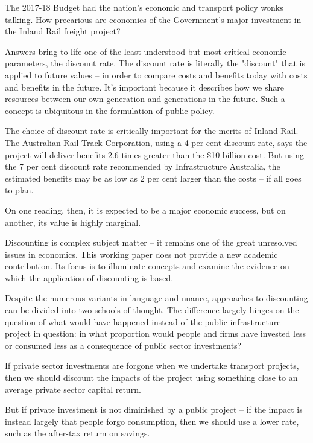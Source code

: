 \begin{overview}

The 2017-18 Budget had the nation’s economic and transport policy wonks talking. How precarious are economics of the Government’s major investment in the Inland Rail freight project?

Answers bring to life one of the least understood but most critical economic parameters, the discount rate. The discount rate is literally the "discount" that is applied to future values -- in order to compare costs and benefits today with costs and benefits in the future. It’s important because it describes how we share resources between our own generation and generations in the future. Such a concept is ubiquitous in the formulation of public policy. 

The choice of discount rate is critically important for the merits of Inland Rail. The Australian Rail Track Corporation, using a 4 per cent discount rate, says the project will deliver benefits 2.6 times greater than the \$10 billion cost. But using the 7 per cent discount rate recommended by Infrastructure Australia, the estimated benefits may be as low as 2 per cent larger than the costs – if all goes to plan. 

On one reading, then, it is expected to be a major economic success, but on another, its value is highly marginal. 

Discounting is complex subject matter -- it remains one of the great unresolved issues in economics. This working paper does not provide a new academic contribution. Its focus is to illuminate concepts and examine the evidence on which the application of discounting is based. 

Despite the numerous variants in language and nuance, approaches to discounting can be divided into two schools of thought. The difference largely hinges on the question of what would have happened instead of the public infrastructure project in question: in what proportion would people and firms have invested less or consumed less as a consequence of public sector investments?

If private sector investments are forgone when we undertake transport projects, then we should discount the impacts of the project using something close to an average private sector capital return. 

But if private investment is not diminished by a public project -- if the impact is instead largely that people forgo consumption, then we should use a lower rate, such as the after-tax return on savings. 


\end{overview}
